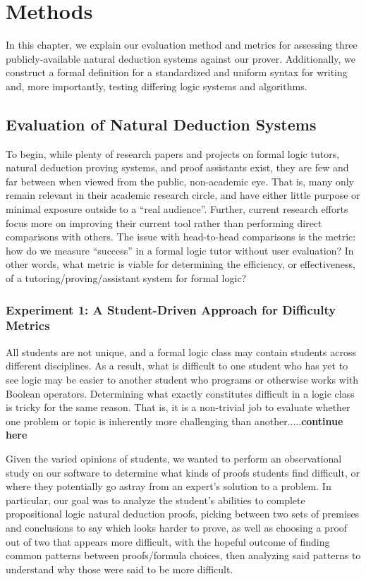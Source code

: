 \documentclass[ms]{uncgdissertationexp2}
\theoremstyle{plain}
\theoremstyle{definition}
\theoremstyle{remark}
\begin{document}
\chapter{Methods}
In this chapter, we explain our evaluation method and metrics for assessing three publicly-available natural deduction systems against our prover. Additionally, we construct a formal definition for a standardized and uniform syntax for writing and, more importantly, testing differing logic systems and algorithms.

\section{Evaluation of Natural Deduction Systems}
To begin, while plenty of research papers and projects on formal logic tutors, natural deduction proving systems, and proof assistants exist, they are few and far between when viewed from the public, non-academic eye. That is, many only remain relevant in their academic research circle, and have either little purpose or minimal exposure outside to a ``real audience''. Further, current research efforts focus more on improving their current tool rather than performing direct comparisons with others. The issue with head-to-head comparisons is the metric: how do we measure ``success'' in a formal logic tutor without user evaluation? In other words, what metric is viable for determining the efficiency, or effectiveness, of a tutoring/proving/assistant system for formal logic?

\subsection{Experiment 1: A Student-Driven Approach for Difficulty Metrics}
All students are not unique, and a formal logic class may contain students across different disciplines. As a result, what is difficult to one student who has yet to see logic may be easier to another student who programs or otherwise works with Boolean operators. Determining what exactly constitutes difficult in a logic class is tricky for the same reason. That is, it is a non-trivial job to evaluate whether one problem or topic is inherently more challenging than another.....\textbf{continue here}

Given the varied opinions of students, we wanted to perform an observational study on our software to determine what kinds of proofs students find difficult, or where they potentially go astray from an expert's solution to a problem. In particular, our goal was to analyze the student's abilities to complete propositional logic natural deduction proofs, picking between two sets of premises and conclusions to say which looks harder to prove, as well as choosing a proof out of two that appears more difficult, with the hopeful outcome of finding common patterns between proofs/formula choices, then analyzing said patterns to understand why those were said to be more difficult.
\end{document}
